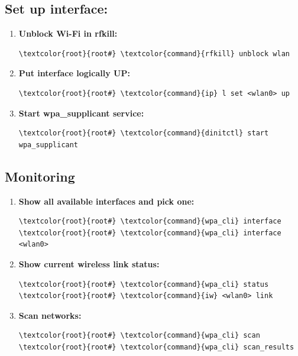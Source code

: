 \documentclass[10pt, a4paper, onecolumn, oneside, titlepage, openany]{book}
\begin{document}
\subsection{Set up interface:}
\begin{enumerate}
    \item \textbf{Unblock Wi-Fi in rfkill:}
\begin{Verbatim}[commandchars=\\\{\}]
\textcolor{root}{root#} \textcolor{command}{rfkill} unblock wlan
\end{Verbatim}
    \item \textbf{Put interface logically UP:}
\begin{Verbatim}[commandchars=\\\{\}]
\textcolor{root}{root#} \textcolor{command}{ip} l set <wlan0> up
\end{Verbatim}
    \item \textbf{Start wpa\_supplicant service:}
\begin{Verbatim}[commandchars=\\\{\}]
\textcolor{root}{root#} \textcolor{command}{dinitctl} start wpa_supplicant
\end{Verbatim}
\end{enumerate}
\subsection{Monitoring}
\begin{enumerate}
    \item \textbf{Show all available interfaces and pick one:}
\begin{Verbatim}[commandchars=\\\{\}]
\textcolor{root}{root#} \textcolor{command}{wpa_cli} interface
\textcolor{root}{root#} \textcolor{command}{wpa_cli} interface <wlan0>
\end{Verbatim}
    \item \textbf{Show current wireless link status:}
\begin{Verbatim}[commandchars=\\\{\}]
\textcolor{root}{root#} \textcolor{command}{wpa_cli} status
\textcolor{root}{root#} \textcolor{command}{iw} <wlan0> link
\end{Verbatim}
    \item \textbf{Scan networks:}
\begin{Verbatim}[commandchars=\\\{\}]
\textcolor{root}{root#} \textcolor{command}{wpa_cli} scan
\textcolor{root}{root#} \textcolor{command}{wpa_cli} scan_results
\end{Verbatim}
\end{enumerate}
\end{document}
